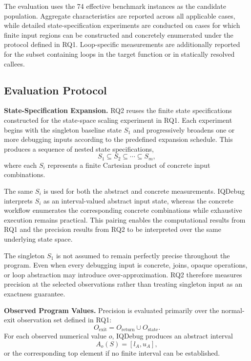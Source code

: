 \documentclass[11pt,oneside]{report}
\theoremstyle{plain}
\theoremstyle{definition}
\theoremstyle{remark}
\begin{document}
The evaluation uses the 74 effective benchmark instances as the candidate population. Aggregate characteristics are reported across all applicable cases, while detailed state-specification experiments are conducted on cases for which finite input regions can be constructed and concretely enumerated under the protocol defined in RQ1. Loop-specific measurements are additionally reported for the subset containing loops in the target function or in statically resolved callees.

\subsection{Evaluation Protocol}
\label{subsec:eval:rq2:protocol}

\noindent\textbf{State-Specification Expansion.}
RQ2 reuses the finite state specifications constructed for the state-space scaling experiment in RQ1. Each experiment begins with the singleton baseline state \(S_1\) and progressively broadens one or more debugging inputs according to the predefined expansion schedule. This produces a sequence of nested state specifications,
\[
S_1
\subseteq
S_2
\subseteq
\cdots
\subseteq
S_m,
\]
where each \(S_i\) represents a finite Cartesian product of concrete input combinations.

The same \(S_i\) is used for both the abstract and concrete measurements. IQDebug interprets \(S_i\) as an interval-valued abstract input state, whereas the concrete workflow enumerates the corresponding concrete combinations while exhaustive execution remains practical. This pairing enables the computational results from RQ1 and the precision results from RQ2 to be interpreted over the same underlying state space.

The singleton \(S_1\) is not assumed to remain perfectly precise throughout the program. Even when every debugging input is concrete, joins, opaque operations, or loop abstraction may introduce over-approximation. RQ2 therefore measures precision at the selected observations rather than treating singleton input as an exactness guarantee.

\medskip
\noindent\textbf{Observed Program Values.}
Precision is evaluated primarily over the normal-exit observation set defined in RQ1:
\[
O_{\mathrm{exit}}
=
O_{\mathrm{return}}
\cup
O_{\mathrm{state}}.
\]
For each observed numerical value \(o\), IQDebug produces an abstract interval
\[
A_o(S)
=
[l_A,u_A],
\]
or the corresponding top element if no finite interval can be established.
\end{document}
